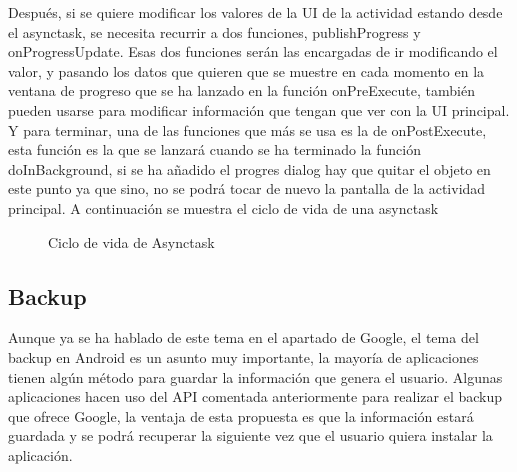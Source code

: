 Después, si se quiere modificar los valores de la UI de la actividad estando desde el asynctask, se necesita recurrir a dos funciones, publishProgress y onProgressUpdate.
Esas dos funciones serán las encargadas de ir modificando el valor, y pasando los datos que quieren que se muestre en cada momento en la ventana de progreso que se ha lanzado en la función onPreExecute, también pueden usarse para modificar información que tengan que ver con la UI principal.
Y para terminar, una de las funciones que más se usa es la de onPostExecute, esta función es la que se lanzará cuando se ha terminado  la función doInBackground, si se ha añadido el progres dialog hay que quitar el objeto en este punto ya que sino, no se podrá tocar de nuevo la pantalla de la actividad principal.
A continuación se muestra el ciclo de vida de una asynctask

\begin{figure}[H] 
  \begin{center} 
    \caption{Ciclo de vida de Asynctask} 
    \label{fig:CicloVidaAsynctask} 
  \end{center} 
\end{figure}

\subsection{Backup}
\label{subsecc:Backup}

Aunque ya se ha hablado de este tema en el apartado de Google, el tema del backup en Android es un asunto muy importante, la mayoría de aplicaciones tienen algún método para guardar la información que genera el usuario.
Algunas aplicaciones hacen uso del API comentada anteriormente para realizar el backup que ofrece Google, la ventaja de esta propuesta es que la información estará guardada y se podrá recuperar la siguiente vez que el usuario quiera instalar la aplicación.

